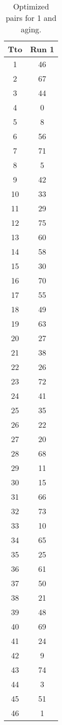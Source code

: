 \begin{table}
  \centering
  \scriptsize
  \caption{Optimized pairs for 1 and aging.}
  \label{tab_pairs}
\begin{tabular}{c c }
\hline
Tto & Run 1 \\
\hline
1 & 46 \\
2 & 67 \\
3 & 44 \\
4 & 0 \\
5 & 8 \\
6 & 56 \\
7 & 71 \\
8 & 5 \\
9 & 42 \\
10 & 33 \\
11 & 29 \\
12 & 75 \\
13 & 60 \\
14 & 58 \\
15 & 30 \\
16 & 70 \\
17 & 55 \\
18 & 49 \\
19 & 63 \\
20 & 27 \\
21 & 38 \\
22 & 26 \\
23 & 72 \\
24 & 41 \\
25 & 35 \\
26 & 22 \\
27 & 20 \\
28 & 68 \\
29 & 11 \\
30 & 15 \\
31 & 66 \\
32 & 73 \\
33 & 10 \\
34 & 65 \\
35 & 25 \\
36 & 61 \\
37 & 50 \\
38 & 21 \\
39 & 48 \\
40 & 69 \\
41 & 24 \\
42 & 9 \\
43 & 74 \\
44 & 3 \\
45 & 51 \\
46 & 1 \\

\end{tabular}
\end{table}
